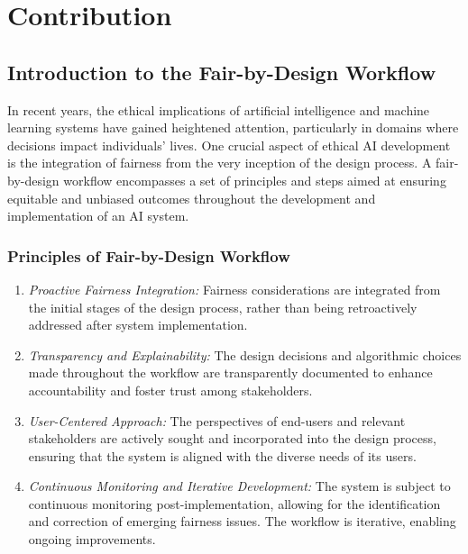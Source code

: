 \documentclass[12pt,a4paper,openright,twoside]{book}
\begin{document}
%

\chapter{Contribution} %
\label{chap:contribution}

\section{Introduction to the Fair-by-Design Workflow}

In recent years, the ethical implications of artificial intelligence and machine learning systems have gained heightened attention, particularly in domains where decisions impact individuals' lives. One crucial aspect of ethical AI development is the integration of fairness from the very inception of the design process. A fair-by-design workflow encompasses a set of principles and steps aimed at ensuring equitable and unbiased outcomes throughout the development and implementation of an AI system.

\subsection{Principles of Fair-by-Design Workflow}

\begin{enumerate}
    \item \emph{Proactive Fairness Integration:} Fairness considerations are integrated from the initial stages of the design process, rather than being retroactively addressed after system implementation.

    \item \emph{Transparency and Explainability:} The design decisions and algorithmic choices made throughout the workflow are transparently documented to enhance accountability and foster trust among stakeholders.

    \item \emph{User-Centered Approach:} The perspectives of end-users and relevant stakeholders are actively sought and incorporated into the design process, ensuring that the system is aligned with the diverse needs of its users.

    \item \emph{Continuous Monitoring and Iterative Development:} The system is subject to continuous monitoring post-implementation, allowing for the identification and correction of emerging fairness issues. The workflow is iterative, enabling ongoing improvements.
\end{enumerate}
\end{document}
